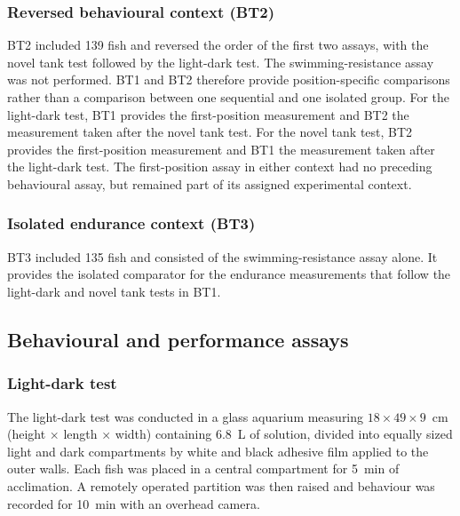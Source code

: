 \documentclass[12pt,a4paper]{article}
\begin{document}
\subsubsection{Reversed behavioural context (BT2)}
\label{sec:bt2}
BT2 included 139 fish and reversed the order of the first two assays, with the novel tank test followed by the light-dark test. The swimming-resistance assay was not performed. BT1 and BT2 therefore provide position-specific comparisons rather than a comparison between one sequential and one isolated group. For the light-dark test, BT1 provides the first-position measurement and BT2 the measurement taken after the novel tank test. For the novel tank test, BT2 provides the first-position measurement and BT1 the measurement taken after the light-dark test. The first-position assay in either context had no preceding behavioural assay, but remained part of its assigned experimental context.

\subsubsection{Isolated endurance context (BT3)}
\label{sec:bt3}
BT3 included 135 fish and consisted of the swimming-resistance assay alone. It provides the isolated comparator for the endurance measurements that follow the light-dark and novel tank tests in BT1.

\subsection{Behavioural and performance assays}
\label{sec:assays}

\subsubsection{Light-dark test}
\label{sec:ldt}
The light-dark test was conducted in a glass aquarium measuring $18 \times 49 \times 9$~cm (height $\times$ length $\times$ width) containing 6.8~L of solution, divided into equally sized light and dark compartments by white and black adhesive film applied to the outer walls. Each fish was placed in a central compartment for 5~min of acclimation. A remotely operated partition was then raised and behaviour was recorded for 10~min with an overhead camera.
\end{document}
